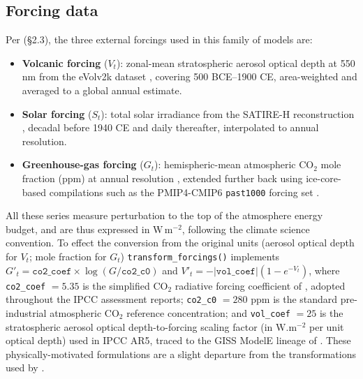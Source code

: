 \documentclass[10pt]{article}
\newcommand{\flag}[1]{\textcolor{gaporange}{\textbf{[FLAG]} #1}}
\newcommand{\rdsub}[1]{\subsection*{#1}}
\begin{document}
\rdsub{Forcing data}
Per \citet{Barboza2019} (\S 2.3), the three external forcings used in this
family of models are:
\begin{itemize}
\item \textbf{Volcanic forcing} ($V_t$): zonal-mean stratospheric aerosol
  optical depth at 550\,nm from the eVolv2k dataset \citep{evolv2k},
  covering 500 BCE--1900 CE, area-weighted and averaged to a global annual
  estimate.
\item \textbf{Solar forcing} ($S_t$): total solar irradiance from the
  SATIRE-H reconstruction \citep{Vieira_AA2011}, decadal before 1940 CE and
  daily thereafter, interpolated to annual resolution.
\item \textbf{Greenhouse-gas forcing} ($G_t$): hemispheric-mean atmospheric
  CO$_2$ mole fraction (ppm) at annual resolution \citep{Meinshausen_GMD2017},
  extended further back using ice-core-based compilations such as the
  PMIP4-CMIP6 \texttt{past1000} forcing set \citep{Jungclaus2017}.
\end{itemize}

All these series measure perturbation to the top of the atmosphere energy
budget, and are thus expressed in $\mathrm{W\,m^{-2}}$, following the
climate science convention. To effect the conversion from the original
units (aerosol optical depth for $V_t$; mole fraction for $G_t$)
\texttt{transform\_forcings()} implements $G'_t = \texttt{co2\_coef} \times
\log(G/\texttt{co2\_c0})$ and $V'_t = -|\texttt{vol\_coef}|(1-e^{-V_t})$,
where \texttt{co2\_coef} $= 5.35$ is the simplified CO$_2$ radiative
forcing coefficient of \citet{myhre1998}, adopted throughout the IPCC
assessment reports; \texttt{co2\_c0} $= 280$ ppm is the standard
pre-industrial atmospheric CO$_2$ reference concentration; and \texttt{vol\_coef} $= 25$ is the
stratospheric aerosol optical depth-to-forcing scaling factor (in
$\mathrm{W.m^{-2}}$ per unit optical depth) used in IPCC AR5, traced to
the GISS ModelE lineage of \citet{Hansen_et_al2005}. These
physically-motivated formulations are a slight departure from the
transformations used by \citet{Barboza2014,Barboza2019}.


\end{document}
